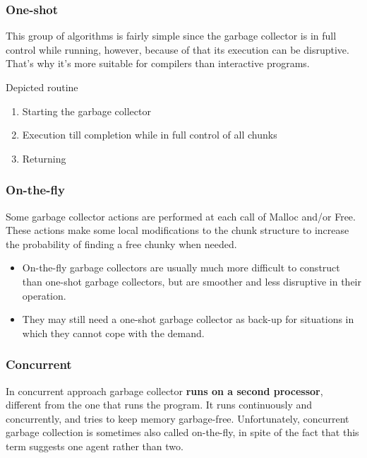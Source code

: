 \documentclass[presentation]{beamer}
\begin{document}
\begin{frame}
    \frametitle{One-shot}
    \justifying
    This group of algorithms is fairly simple since the garbage collector is in full control while running, however, because of that its execution can be disruptive. That's why it's more suitable for compilers than interactive programs.
    
    \begin{block}{Depicted routine}
        \begin{enumerate}
            \item Starting the garbage collector
            \item Execution till completion while in full control of all chunks
            \item Returning
        \end{enumerate}
    \end{block}
\end{frame}

\begin{frame}
    \frametitle{On-the-fly}
    \justifying
    Some garbage collector actions are performed at each call of Malloc and/or Free. These actions make some local modifications to the chunk structure to increase the probability of finding a free chunky when needed.
    
    \begin{itemize}
        \item On-the-fly garbage collectors are usually much more difficult to construct than one-shot garbage collectors, but are smoother and less disruptive in their operation.
        \item They may still need a one-shot garbage collector as back-up for situations in which they cannot cope with the demand.
    \end{itemize}
\end{frame}


\begin{frame}
    \frametitle{Concurrent}
    \justifying
    In concurrent approach garbage collector \textbf{runs on a second processor}, different from the one that runs the program. It runs continuously and concurrently, and tries to keep memory garbage-free. Unfortunately, concurrent garbage collection is sometimes also called on-the-fly, in spite of the fact that this term suggests one agent rather than two.
\end{frame}
\end{document}
